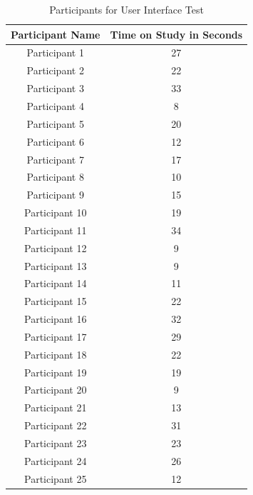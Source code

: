 \begin{table}[htbp]
    \centering
    \begin{tabular}{|c|c|}
    \hline
    \textbf{Participant Name} & \textbf{Time on Study in Seconds} \\ \hline
    Participant 1             & 27                                \\ \hline
    Participant 2             & 22                                \\ \hline
    Participant 3             & 33                                \\ \hline
    Participant 4             & 8                                \\ \hline
    Participant 5             & 20                                \\ \hline
    Participant 6             & 12                                \\ \hline
    Participant 7             & 17                                \\ \hline
    Participant 8             & 10                                \\ \hline
    Participant 9             & 15                                \\ \hline
    Participant 10             & 19                                \\ \hline
    Participant 11             & 34                                \\ \hline
    Participant 12             & 9                                \\ \hline
    Participant 13             & 9                                \\ \hline
    Participant 14             & 11                                \\ \hline
    Participant 15             & 22                                \\ \hline
    Participant 16             & 32                                \\ \hline
    Participant 17             & 29                                \\ \hline
    Participant 18             & 22                                \\ \hline
    Participant 19             & 19                                \\ \hline
    Participant 20             & 9                                \\ \hline
    Participant 21             & 13                                \\ \hline
    Participant 22             & 31                                \\ \hline
    Participant 23             & 23                                \\ \hline
    Participant 24             & 26                                \\ \hline
    Participant 25             & 12                                \\ \hline
    \end{tabular}
    \caption{Participants for User Interface Test}
    \label{fig:heatmapTimes}
    \end{table}
